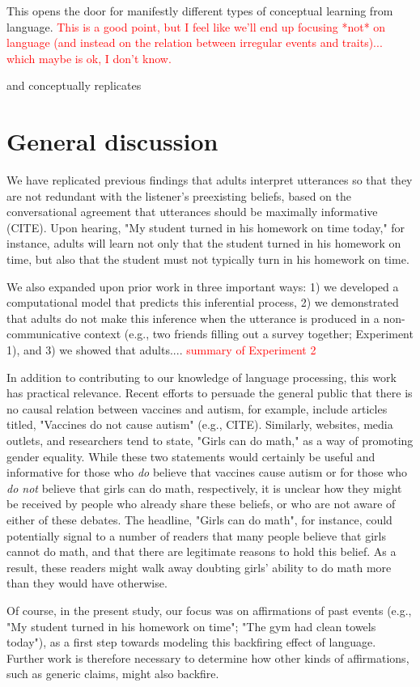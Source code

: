 \documentclass[10pt,letterpaper]{article}
\newcommand{\red}[1]{\textcolor{Red}{#1}}
\begin{document}
This opens the door for manifestly different types of conceptual learning from language. \red{This is a good point, but I feel like we'll end up focusing *not* on language (and instead on the relation between irregular events and traits)... which maybe is ok, I don't know.}


and conceptually replicates  


\section{General discussion}

We have replicated previous findings that adults interpret utterances so that they are not redundant with the listener's preexisting beliefs, based on the conversational agreement that utterances should be maximally informative (CITE).  Upon hearing, "My student turned in his homework on time today," for instance, adults will learn not only that the student turned in his homework on time, but also that the student must not typically turn in his homework on time.

We also expanded upon prior work in three important ways: 1) we developed a computational model that predicts this inferential process, 2) we demonstrated that adults do not make this inference when the utterance is produced in a non-communicative context (e.g., two friends filling out a survey together; Experiment 1), and 3) we showed that adults.... \red{summary of Experiment 2}

In addition to contributing to our knowledge of language processing, this work has practical relevance.  Recent efforts to persuade the general public that there is no causal relation between vaccines and autism, for example, include articles titled, "Vaccines do not cause autism" (e.g., CITE).  Similarly, websites, media outlets, and researchers tend to state, "Girls can do math," as a way of promoting gender equality.  While these two statements would certainly be useful and informative for those who \emph{do} believe that vaccines cause autism or for those who \emph{do not} believe that girls can do math, respectively, it is unclear how they might be received by people who already share these beliefs, or who are not aware of either of these debates.  The headline, "Girls can do math", for instance, could potentially signal to a number of readers that many people believe that girls cannot do math, and that there are legitimate reasons to hold this belief.  As a result, these readers might walk away doubting girls' ability to do math more than they would have otherwise.

Of course, in the present study, our focus was on affirmations of past events (e.g., "My student turned in his homework on time"; "The gym had clean towels today"), as a first step towards modeling this backfiring effect of language.  Further work is therefore necessary to determine how other kinds of affirmations, such as generic claims, might also backfire.





\setlength{\bibleftmargin}{.125in}
\setlength{\bibindent}{-\bibleftmargin}


\end{document}
